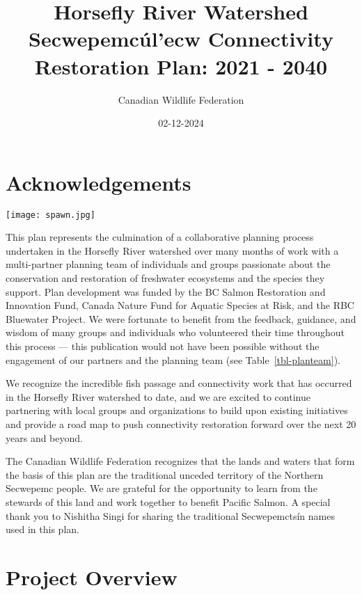 \documentclass[
  letterpaper,
  DIV=11,
  numbers=noendperiod]{scrreprt}
\title{Horsefly River Watershed Secwepemcúl'ecw Connectivity Restoration
Plan: 2021 - 2040}
\author{Canadian Wildlife Federation}
\date{02-12-2024}
\renewcommand*\contentsname{Table of contents}
\newcommand\contentsname{Table of contents}
\begin{document}
\maketitle

\renewcommand*\contentsname{Table of contents}
{
\hypersetup{linkcolor=}
\setcounter{tocdepth}{1}
\tableofcontents
}


\chapter*{Acknowledgements}\label{acknowledgements}


\texttt{[image: spawn.jpg]}

This plan represents the culmination of a collaborative planning process
undertaken in the Horsefly River watershed over many months of work with
a multi-partner planning team of individuals and groups passionate about
the conservation and restoration of freshwater ecosystems and the
species they support. Plan development was funded by the BC Salmon
Restoration and Innovation Fund, Canada Nature Fund for Aquatic Species
at Risk, and the RBC Bluewater Project. We were fortunate to benefit
from the feedback, guidance, and wisdom of many groups and individuals
who volunteered their time throughout this process --- this publication
would not have been possible without the engagement of our partners and
the planning team (see Table~\ref{tbl-planteam}).

We recognize the incredible fish passage and connectivity work that has
occurred in the Horsefly River watershed to date, and we are excited to
continue partnering with local groups and organizations to build upon
existing initiatives and provide a road map to push connectivity
restoration forward over the next 20 years and beyond.

The Canadian Wildlife Federation recognizes that the lands and waters
that form the basis of this plan are the traditional unceded territory
of the Northern Secwepemc people. We are grateful for the opportunity to
learn from the stewards of this land and work together to benefit
Pacific Salmon. A special thank you to Nishitha Singi for sharing the
traditional Secwepemctsín names used in this plan.


\chapter*{Project Overview}\label{project-overview}
\end{document}
